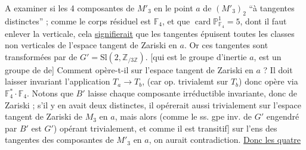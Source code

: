 A examiner si les  4 composantes de $M'_3$ en le point $a$ de $(M'_3)_2$  ``à tangentes distinctes'' ; comme le corps résiduel est $\mathbb F_4$, et que $\operatorname{card}\mathbb P^1_{\mathbb F_4}=5$, dont il faut enlever la verticale, cela \uline{signifierait} que les tangentes épuisent toutes les classes non verticales de l'espace tangent de Zariski en $a$. Or ces tangentes sont transformées  par  de $G'=\mathrm{Sl}(2,\mathbb Z_{/3\mathbb Z})$. [qui est le  groupe d'inertie  $a$, est un groupe de   de]  Comment opère-t-il sur l'espace tangent de Zariski  en $a$ ?  Il doit laisser invariant l'application $T_a\to T_b$,  (car op. trivialemt sur $T_b$) donc opère via $\mathbb F_4^*\cdot\mathbb F_4$.
Notons que $B'$  laisse chaque composante irréductible invariante, donc     de Zariski ;  s'il y en avait deux distinctes, il opérerait aussi trivialement sur l'espace tangent de Zariski de $M_3$ en $a$, mais alors (comme le ss. gpe inv. de $G'$ engendré par $B'$ est $G'$)   opérant trivialement, et comme il est transitif] sur l'ens des tangentes des composantes de $M'_3$ en $a$, on aurait contradiction. \uline{Donc les quatre}
